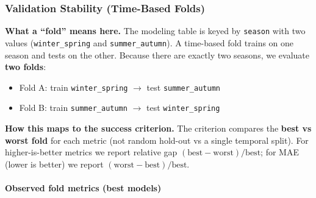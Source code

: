 \subsubsection{Validation Stability (Time-Based Folds)}

\textbf{What a ``fold'' means here.} The modeling table is keyed by \texttt{season} with two values (\texttt{winter\_spring} and \texttt{summer\_autumn}). A time-based fold trains on one season and tests on the other. Because there are exactly two seasons, we evaluate \textbf{two folds}:
\begin{itemize}
    \item Fold A: train \texttt{winter\_spring} $\rightarrow$ test \texttt{summer\_autumn}
    \item Fold B: train \texttt{summer\_autumn} $\rightarrow$ test \texttt{winter\_spring}
\end{itemize}

\textbf{How this maps to the success criterion.} The criterion compares the \textbf{best vs worst fold} for each metric (not random hold-out vs a single temporal split). For higher-is-better metrics we report relative gap $(\text{best}-\text{worst})/\text{best}$; for MAE (lower is better) we report $(\text{worst}-\text{best})/\text{best}$.

\paragraph{Observed fold metrics (best models)}
\begin{table}[H]
\centering
{}
\caption{Time-based fold metrics for classification, ranking, and regression}
\label{tab:modeling_fold_metrics}
\end{table}


